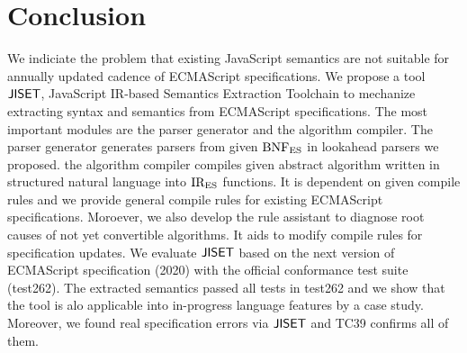 \section{Conclusion}\label{sec:conclude}

We indiciate the problem that existing JavaScript semantics are not suitable for
annually updated cadence of ECMAScript specifications. We propose a tool \( \text{\sf JISET} \),
JavaScript IR-based Semantics Extraction Toolchain to mechanize extracting syntax
and semantics from ECMAScript specifications. The most important modules are
the parser generator and the algorithm compiler. The parser generator generates
parsers from given \( \text{BNF}_{\text{ES}} \) in lookahead parsers we proposed. the algorithm
compiler compiles given abstract algorithm written in structured natural language
into \( \text{IR}_\text{ES} \) functions. It is dependent on given compile rules and we provide
general compile rules for existing ECMAScript specifications. Moroever, we also
develop the rule assistant to diagnose root causes of not yet convertible algorithms.
It aids to modify compile rules for specification updates. We evaluate \( \text{\sf JISET} \)
based on the next version of ECMAScript specification (2020) with the official conformance test
suite (test262). The extracted semantics passed all  tests in test262
and we show that the tool is alo applicable into in-progress language features
by a case study. Moreover, we found  real specification errors via \( \text{\sf JISET} \)
and TC39 confirms all of them.
